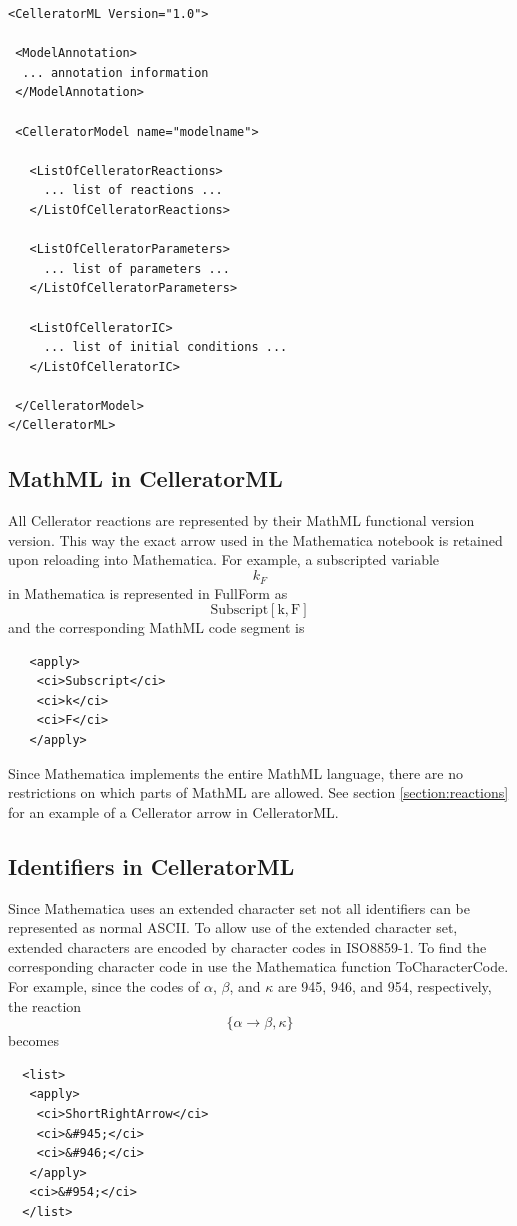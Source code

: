 \documentclass[12pt,letterpaper]{article}
\begin{document}
\begin{verbatim}
<CelleratorML Version="1.0">

 <ModelAnnotation>
  ... annotation information
 </ModelAnnotation>

 <CelleratorModel name="modelname">

   <ListOfCelleratorReactions>
     ... list of reactions ...
   </ListOfCelleratorReactions>
  
   <ListOfCelleratorParameters>
     ... list of parameters ...
   </ListOfCelleratorParameters>

   <ListOfCelleratorIC>
     ... list of initial conditions ...
   </ListOfCelleratorIC>

 </CelleratorModel>
</CelleratorML>

\end{verbatim}


\subsection{MathML in CelleratorML}
All Cellerator reactions are represented by their MathML functional version version. This way the exact arrow used in the Mathematica notebook is retained upon reloading into Mathematica. For example, a subscripted variable
$$k_F$$
in Mathematica is represented in FullForm as 
$$\text{Subscript}[\text{k}, \text{F}]$$
and the corresponding MathML code segment is
\begin{verbatim}
   <apply>
    <ci>Subscript</ci>
    <ci>k</ci>
    <ci>F</ci>
   </apply>
\end{verbatim}
Since Mathematica implements the entire MathML language, there are no restrictions on which parts of MathML are allowed. 
See section \ref{section:reactions} for an example of a Cellerator arrow in CelleratorML.
\subsection{Identifiers in CelleratorML}\label{subsection:character}
Since Mathematica uses an extended character set not all identifiers can be represented as normal ASCII. To allow use of the extended character set, extended characters are encoded by character codes in ISO8859-1. To find the corresponding character code in use the Mathematica function ToCharacterCode. For example, since the codes of $\alpha$, $\beta$, and $\kappa$ are 945, 946, and 954, respectively, the reaction
$$\{\alpha \rightarrow \beta, \kappa\}$$
becomes
\begin{verbatim}
  <list>
   <apply>
    <ci>ShortRightArrow</ci>
    <ci>&#945;</ci>
    <ci>&#946;</ci>
   </apply>
   <ci>&#954;</ci>
  </list>
\end{verbatim}
\end{document}
